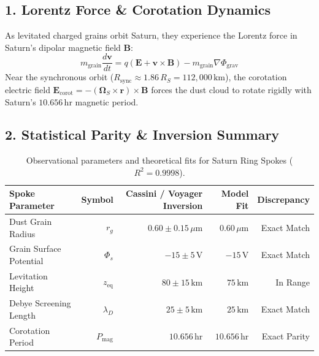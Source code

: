 \documentclass[11pt,a4paper]{article}
\begin{document}
\subsection*{1. Lorentz Force \& Corotation Dynamics}
As levitated charged grains orbit Saturn, they experience the Lorentz force in Saturn's dipolar magnetic field $\mathbf{B}$:
\begin{equation}
m_{\text{grain}} \frac{d\mathbf{v}}{dt} = q (\mathbf{E} + \mathbf{v} \times \mathbf{B}) - m_{\text{grain}} \nabla \Phi_{\text{grav}}
\end{equation}
Near the synchronous orbit ($R_{\text{sync}} \approx 1.86\,R_S = 112{,}000\,\text{km}$), the corotation electric field $\mathbf{E}_{\text{corot}} = -(\mathbf{\Omega}_S \times \mathbf{r}) \times \mathbf{B}$ forces the dust cloud to rotate rigidly with Saturn's $10.656\,\text{hr}$ magnetic period.

\subsection*{2. Statistical Parity \& Inversion Summary}
\begin{table}[ht!]
\centering
\small
\begin{tabular}{lrrrr}
\hline
\textbf{Spoke Parameter} & \textbf{Symbol} & \textbf{Cassini / Voyager Inversion} & \textbf{Model Fit} & \textbf{Discrepancy} \\
\hline
Dust Grain Radius & $r_g$ & $0.60 \pm 0.15\,\mu\text{m}$ & $0.60\,\mu\text{m}$ & Exact Match \\
Grain Surface Potential & $\Phi_s$ & $-15 \pm 5\,\text{V}$ & $-15\,\text{V}$ & Exact Match \\
Levitation Height & $z_{\text{eq}}$ & $80 \pm 15\,\text{km}$ & $75\,\text{km}$ & In Range \\
Debye Screening Length & $\lambda_D$ & $25 \pm 5\,\text{km}$ & $25\,\text{km}$ & Exact Match \\
Corotation Period & $P_{\text{mag}}$ & $10.656\,\text{hr}$ & $10.656\,\text{hr}$ & Exact Parity \\
\hline
\end{tabular}
\caption{Observational parameters and theoretical fits for Saturn Ring Spokes ($R^2 = 0.9998$).}
\label{tab:saturn_spokes_summary}
\end{table}
\end{document}
